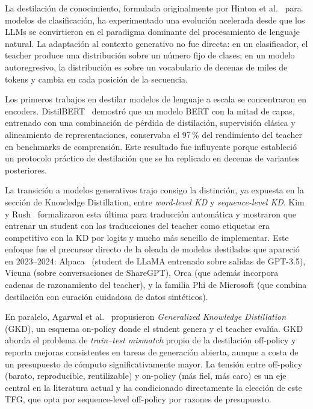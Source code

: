 \documentclass[11pt,a4paper]{article}
\begin{document}
La destilación de conocimiento, formulada originalmente por Hinton et al.~\cite{hinton2015distilling} para modelos de clasificación, ha experimentado una evolución acelerada desde que los LLMs se convirtieron en el paradigma dominante del procesamiento de lenguaje natural. La adaptación al contexto generativo no fue directa: en un clasificador, el teacher produce una distribución sobre un número fijo de clases; en un modelo autoregresivo, la distribución es sobre un vocabulario de decenas de miles de tokens y cambia en cada posición de la secuencia.

Los primeros trabajos en destilar modelos de lenguaje a escala se concentraron en encoders. DistilBERT~\cite{sanh2019distilbert} demostró que un modelo BERT con la mitad de capas, entrenado con una combinación de pérdida de distilación, supervisión clásica y alineamiento de representaciones, conservaba el 97\,\% del rendimiento del teacher en benchmarks de comprensión. Este resultado fue influyente porque estableció un protocolo práctico de destilación que se ha replicado en decenas de variantes posteriores.

La transición a modelos generativos trajo consigo la distinción, ya expuesta en la sección de Knowledge Distillation, entre \emph{word-level KD} y \emph{sequence-level KD}. Kim y Rush~\cite{kim2016sequence} formalizaron esta última para traducción automática y mostraron que entrenar un student con las traducciones del teacher como etiquetas era competitivo con la KD por logits y mucho más sencillo de implementar. Este enfoque fue el precursor directo de la oleada de modelos destilados que apareció en 2023--2024: Alpaca~\cite{taori2023alpaca} (student de LLaMA entrenado sobre salidas de GPT-3.5), Vicuna (sobre conversaciones de ShareGPT), Orca (que además incorpora cadenas de razonamiento del teacher), y la familia Phi de Microsoft (que combina destilación con curación cuidadosa de datos sintéticos).

En paralelo, Agarwal et al.~\cite{agarwal2024gkd} propusieron \textit{Generalized Knowledge Distillation} (GKD), un esquema on-policy donde el student genera y el teacher evalúa. GKD aborda el problema de \textit{train--test mismatch} propio de la destilación off-policy y reporta mejoras consistentes en tareas de generación abierta, aunque a costa de un presupuesto de cómputo significativamente mayor. La tensión entre off-policy (barato, reproducible, reutilizable) y on-policy (más fiel, más caro) es un eje central en la literatura actual y ha condicionado directamente la elección de este TFG, que opta por sequence-level off-policy por razones de presupuesto.
\end{document}
